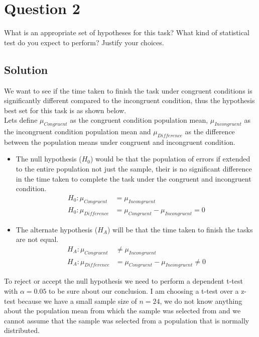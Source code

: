 \documentclass[12pt]{article}%
\begin{document}
\section*{Question 2}

What is an appropriate set of hypotheses for this task? What kind of statistical test do you expect to perform? Justify your choices.

\subsection*{Solution}

We want to see if the time taken to finish the task under congruent conditions is significantly different compared to the incongruent condition, thus the hypothesis best set for this task is as shown below.\\

Lets define $\mu_{Congruent}$ as the congruent condition population mean, $\mu_{Incongruent}$ as the incongruent condition population mean and $\mu_{Difference}$ as the difference between the population means under congruent and incongruent condition.

\begin{itemize}
  \item The null hypothesis ($H_0$) would be that the population of errors if extended to the entire population not just the sample, their is no significant difference in the time taken to complete the task under the congruent and incongruent condition.
  \begin{align*}
  H_{0}:  \mu_{Congruent} &= \mu_{Incongruent} \\
  H_{0}:  \mu_{Difference} &= \mu_{Congruent} - \mu_{Incongruent} = 0
  \end{align*}
  \item  The alternate hypothesis ($H_A$) will be that the time taken to finish the tasks are not equal.
  \begin{align*}
   H_{A}:  \mu_{Congruent} &\neq \mu_{Incongruent} \\
    H_{A}:  \mu_{Difference} &= \mu_{Congruent} - \mu_{Incongruent} \neq 0
  \end{align*}
\end{itemize}

To reject or accept the null hypothesis we need to perform a dependent t-test with $\alpha=0.05$ to be sure about our conclusion. I am choosing a t-test over a z-test because we have a small sample size of $n=24$, we do not know anything about the population mean from which the sample was selected from and we cannot assume that the sample was selected from a population that is normally distributed. \\
\end{document}
